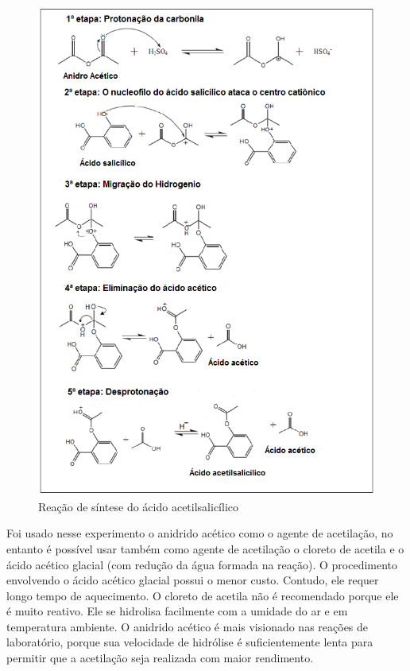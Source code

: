\begin{figure}[H]
\begin{center}
    \includegraphics[width=1.1\textwidth]{figuras/im2_sintese.png}
\end{center}
\caption{Reação de síntese do ácido acetilsalicílico}\label{fig:im2}%
\end{figure}

Foi usado nesse experimento o anidrido acético como o agente de acetilação, no entanto é possível
usar também como agente de acetilação o cloreto de acetila e o ácido acético glacial (com redução da
água formada na reação). O procedimento envolvendo o ácido acético glacial possui o menor custo.
Contudo, ele requer longo tempo de aquecimento. O cloreto de acetila não é recomendado porque ele é
muito reativo. Ele se hidrolisa facilmente com a umidade do ar e em temperatura ambiente. O anidrido
acético é mais visionado nas reações de laboratório, porque sua velocidade de hidrólise é
suficientemente lenta para permitir que a acetilação seja realizada com maior
rendimento.\cite{PERUCH2013}

